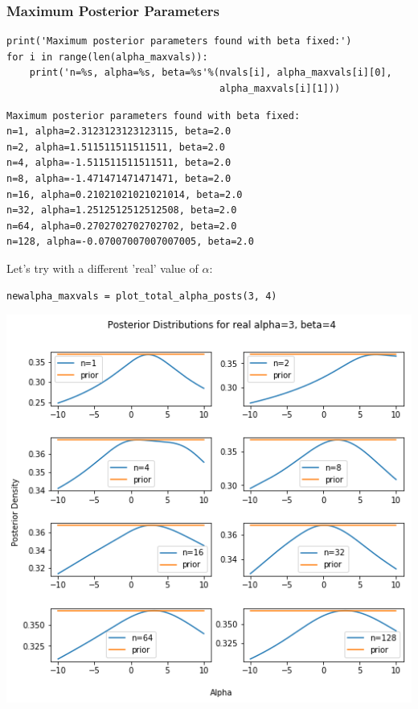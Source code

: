 \documentclass[11pt]{article}
\begin{document}
\subsubsection*{Maximum Posterior Parameters}
\label{sec-2-4-1}

\begin{verbatim}
print('Maximum posterior parameters found with beta fixed:')
for i in range(len(alpha_maxvals)):
    print('n=%s, alpha=%s, beta=%s'%(nvals[i], alpha_maxvals[i][0], 
                                     alpha_maxvals[i][1]))
\end{verbatim}

\begin{verbatim}
Maximum posterior parameters found with beta fixed:
n=1, alpha=2.3123123123123115, beta=2.0
n=2, alpha=1.511511511511511, beta=2.0
n=4, alpha=-1.511511511511511, beta=2.0
n=8, alpha=-1.471471471471471, beta=2.0
n=16, alpha=0.21021021021021014, beta=2.0
n=32, alpha=1.2512512512512508, beta=2.0
n=64, alpha=0.2702702702702702, beta=2.0
n=128, alpha=-0.07007007007007005, beta=2.0
\end{verbatim}

Let's try with a different 'real' value of $\alpha$:

\begin{verbatim}
newalpha_maxvals = plot_total_alpha_posts(3, 4)
\end{verbatim}

\includegraphics[width=.9\linewidth]{./obipy-resources/322uSQ.png}
\end{document}
